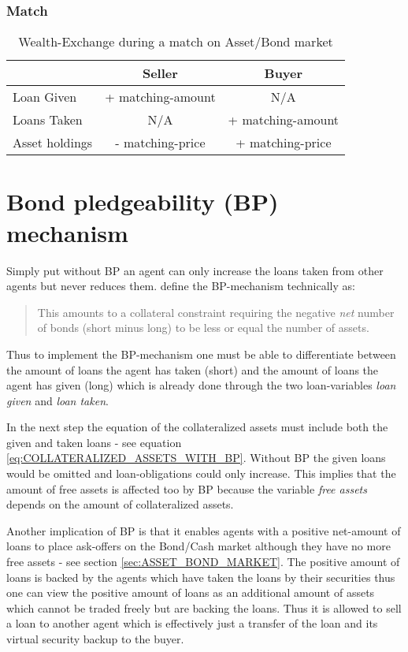 \documentclass[Bachelorarbeit.tex]{subfiles}
\begin{document}
\subsubsection{Match}

\begin{table}[H]
	\centering
	\caption{Wealth-Exchange during a match on Asset/Bond market}
	\begin{tabular} { l c c }
		& Seller & Buyer \\
		\hline
		Loan Given & + matching-amount & N/A \\
		Loans Taken & N/A & + matching-amount \\
		Asset holdings & - matching-price & + matching-price \\
		\hline
	\end{tabular}
\end{table}

\section{Bond pledgeability (BP) mechanism}
Simply put without BP an agent can only increase the loans taken from other agents but never reduces them. \cite{Breuer2015} define the BP-mechanism technically as: 

\begin{quote}
This amounts to a collateral constraint requiring the negative \textit{net} number of bonds (short minus long) to be less or equal the number of assets.
\end{quote}

Thus to implement the BP-mechanism one must be able to differentiate between the amount of loans the agent has taken (short) and the amount of loans the agent has given (long) which is already done through the two loan-variables \textit{loan given} and \textit{loan taken}.
 
\medskip

In the next step the equation of the collateralized assets must include both the given and taken loans - see equation \ref{eq:COLLATERALIZED_ASSETS_WITH_BP}. Without BP the given loans would be omitted and loan-obligations could only increase. This implies that the amount of free assets is affected too by BP because the variable \textit{free assets} depends on the amount of collateralized assets. 

\medskip

Another implication of BP is that it enables agents with a positive net-amount of loans to place ask-offers on the Bond/Cash market although they have no more free assets - see section \ref{sec:ASSET_BOND_MARKET}. The positive amount of loans is backed by the agents which have taken the loans by their securities thus one can view the positive amount of loans as an additional amount of assets which cannot be traded freely but are backing the loans. Thus it is allowed to sell a loan to another agent which is effectively just a transfer of the loan and its virtual security backup to the buyer.
\end{document}
